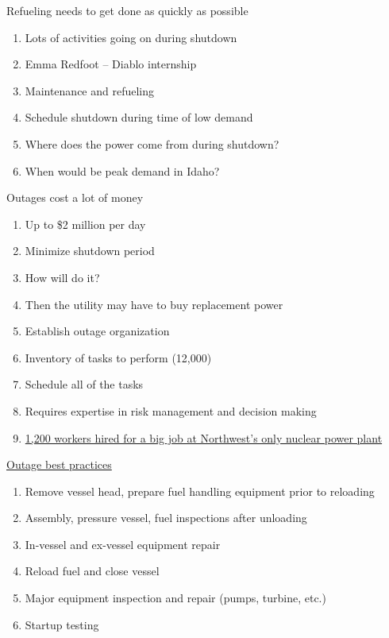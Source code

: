 \documentclass[aspectratio=1610,pdftex,dvipsnames,compress,xcolor={dvipsnames}]{beamer}
\newcommand{\acsp}{\acrshortpl} %
\begin{document}
\addtocounter{framenumber}{-1} 
\begin{frame}{Refueling needs to get done as quickly as possible}
    \begin{enumerate}[series=outerlist,topsep=0pt,itemsep=11pt,leftmargin=*,label=(\arabic*)]
        \item[]Lots of activities going on during shutdown
        \item[]Emma Redfoot -- Diablo internship
        \item[]Maintenance and refueling
        \item[]Schedule shutdown during time of low demand
        \item[]Where does the power come from during shutdown?
        \item[]When would be peak demand in Idaho?
    \end{enumerate}
\end{frame}


\begin{frame}{Outages cost a lot of money}
    \begin{enumerate}[series=outerlist,topsep=0pt,itemsep=11pt,leftmargin=*,label=(\arabic*)]
        \item[]Up to \$2 million per day
        \item[]Minimize shutdown period
        \item[]How will \acsp{smr} do it?
        \item[]Then the utility may have to buy replacement power
        \item[]Establish outage organization
        \item[]Inventory of tasks to perform (12,000)
        \item[]Schedule all of the tasks
        \item[]Requires expertise in risk management and decision making
        \item[]\href{https://currently.att.yahoo.com/att/1-200-workers-hired-big-120000470.html}{1,200 workers hired for a big job at Northwest's only nuclear power plant}
    \end{enumerate}
\end{frame}


\begin{frame}{\href{http://www.iaea.org/inis/collection/NCLCollectionStore/_Public/23/014/23014979.pdf}{Outage best practices}}
    \begin{enumerate}[series=outerlist,topsep=0pt,itemsep=11pt,leftmargin=*,label=(\arabic*)]
        \item[]Remove vessel head, prepare fuel handling equipment prior to reloading
        \item[]Assembly, pressure vessel, fuel inspections after unloading
        \item[]In-vessel and ex-vessel equipment repair
        \item[]Reload fuel and close vessel
        \item[]Major equipment inspection and repair (pumps, turbine, etc.)
        \item[]Startup testing
    \end{enumerate}
\end{frame}
\end{document}
